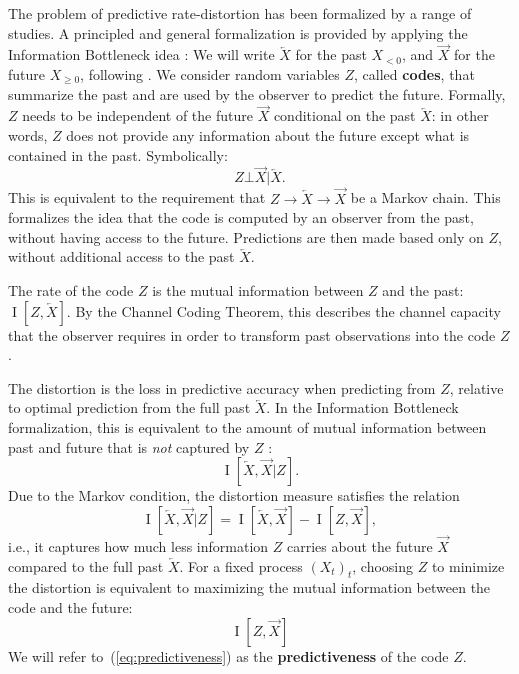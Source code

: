 \documentclass[entropy,article,submit,moreauthors,pdftex,10pt,a4paper]{Definitions/mdpi}
\newif \ifcomment
\newcommand\rljf[1]{\ifcomment{{\color{blue}(#1)}}\else{}\fi}
\newcommand{\future}{\overrightarrow{X}}
\newcommand{\past}{\overleftarrow{X}}
\newcommand{\key}{\textbf}
\begin{document}
The problem of predictive rate-distortion has been formalized by a range of studies.
A principled and general formalization is provided by applying the Information Bottleneck idea \citep{tishby-information-1999, still-optimal-2010,marzen-predictive-2016}:
We will write $\past$ for the past $X_{< 0}$, and $\future$ for the future $X_{\geq 0}$, following \cite{marzen-predictive-2016}.
We consider random variables $Z$, called \key{codes}, that summarize the past and are used by the observer to predict the future.
Formally, $Z$ needs to be independent of the future $\future$ conditional on the past $\past$: in other words, $Z$ does not provide any information about the future except what is contained in the past. Symbolically:
\begin{equation}\label{eq:markov}
	Z \bot \future | \past.
\end{equation}
This is equivalent to the requirement that $Z \rightarrow \past \rightarrow \future$ be a Markov chain.
This formalizes the idea that the code is computed by an observer from the past, without having access to the future.
Predictions are then made based only on $Z$, without additional access to the past $\past$.

The rate of the code $Z$ is the mutual information between $Z$ and the past: $\operatorname{I}[Z, \past]$.
By the Channel Coding Theorem, this describes the channel capacity that the observer requires in order to transform past observations into the code $Z$.

The distortion is the loss in predictive accuracy when predicting from $Z$, relative to optimal prediction from the full past $\past$.
In the Information Bottleneck formalization, this is equivalent to the amount of mutual information between past and future that is \emph{not} captured by $Z$ \citep{harremoes2007information}: %
\begin{equation}
	\operatorname{I}[\past, \future|Z].
\end{equation}
Due to the Markov condition, the distortion measure satisfies the relation
\begin{equation}
	\operatorname{I}[\past, \future|Z] = \operatorname{I}[\past, \future] - \operatorname{I}[Z, \future],
\end{equation}
i.e., it captures how much less information $Z$ carries about the future $\future$ compared to the full past $\past$.
For a fixed process $(X_t)_t$, choosing $Z$ to minimize the distortion is equivalent to maximizing the mutual information between the code and the future:
\begin{equation}\label{eq:predictiveness}
\operatorname{I}[Z, \future]
\end{equation}
We will refer to~(\ref{eq:predictiveness}) as the \key{predictiveness} of the code $Z$.
\end{document}
